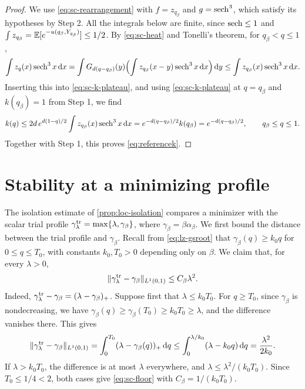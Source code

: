 \begin{proof}
We use \eqref{eq:sc-rearrangement} with $f=z_{q_\beta}$ and
$g=\operatorname{sech}^3$, which satisfy its hypotheses by Step 2. All the integrals
below are finite, since $\operatorname{sech}\le1$ and
$\int z_{q_\beta}=\mathbb E[e^{-u(q_\beta,Y_{q_\beta})}]\le1/2$. By
\eqref{eq:sc-heat} and Tonelli's theorem, for $q_\beta<q\le1$,
\[
 \int z_q(x)\operatorname{sech}^3x\,\mathrm d x
 =\int G_{d(q-q_\beta)}(y)\Bigl(\int z_{q_\beta}(x-y)\operatorname{sech}^3x\,\mathrm d x\Bigr)\,\mathrm d y
 \le\int z_{q_\beta}(x)\operatorname{sech}^3x\,\mathrm d x .
\]
Inserting this into \eqref{eq:sc-k-plateau}, and using
\eqref{eq:sc-k-plateau} at $q=q_\beta$ and $k(q_\beta)=1$ from Step 1,
we find
\[
 k(q)\le2d\,e^{d(1-q)/2}\int z_{q_\beta}(x)\operatorname{sech}^3x\,\mathrm d x
 =e^{-d(q-q_\beta)/2}k(q_\beta)=e^{-d(q-q_\beta)/2},
 \qquad q_\beta\le q\le1 .
\]
Together with Step 1, this proves \eqref{eq:referencek}.
\end{proof}

\section{Stability at a minimizing profile}\label{sec:sc-minimizer}

The isolation estimate of \cref{prop:loc-isolation} compares a
minimizer with the scalar trial profile
$\gamma^{\rm tr}_\lambda=\max\{\lambda,\gamma_\beta\}$, where
$\gamma_\beta=\beta\alpha_\beta$. We first bound the distance between
the trial profile and $\gamma_\beta$. Recall from \eqref{eq:lz-gsroot}
that $\gamma_\beta(q)\ge k_0q$ for $0\le q\le T_0$, with constants
$k_0,T_0>0$ depending only on $\beta$. We claim that, for every
$\lambda>0$,
\begin{equation}\label{eq:sc-floor}
 \|\gamma^{\rm tr}_\lambda-\gamma_\beta\|_{L^1(0,1)}
 \le C_\beta\lambda^2 .
\end{equation}
Indeed, $\gamma^{\rm tr}_\lambda-\gamma_\beta=(\lambda-\gamma_\beta)_+$.
Suppose first that $\lambda\le k_0T_0$. For $q\ge T_0$, since
$\gamma_\beta$ is nondecreasing, we have
$\gamma_\beta(q)\ge\gamma_\beta(T_0)\ge k_0T_0\ge\lambda$, and the
difference vanishes there. This gives
\[
 \|\gamma^{\rm tr}_\lambda-\gamma_\beta\|_{L^1(0,1)}
 =\int_0^{T_0}(\lambda-\gamma_\beta(q))_+\,\mathrm d q
 \le\int_0^{\lambda/k_0}(\lambda-k_0q)\,\mathrm d q=\frac{\lambda^2}{2k_0}.
\]
If $\lambda>k_0T_0$, the difference is at most $\lambda$ everywhere,
and $\lambda\le\lambda^2/(k_0T_0)$. Since $T_0\le1/4<2$, both cases give
\eqref{eq:sc-floor} with $C_\beta=1/(k_0T_0)$.

